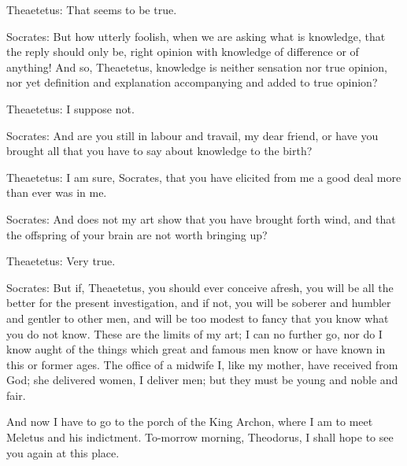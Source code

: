 Theaetetus: That seems to be true.

Socrates: But how utterly foolish, when we are asking what is knowledge,
that the reply should only be, right opinion with knowledge of
difference or of anything! And so, Theaetetus, knowledge is neither
sensation nor true opinion, nor yet definition and explanation
accompanying and added to true opinion?

Theaetetus: I suppose not.

Socrates: And are you still in labour and travail, my dear friend, or
have you brought all that you have to say about knowledge to the birth?

Theaetetus: I am sure, Socrates, that you have elicited from me a good
deal more than ever was in me.

Socrates: And does not my art show that you have brought forth wind, and
that the offspring of your brain are not worth bringing up?

Theaetetus: Very true.

Socrates: But if, Theaetetus, you should ever conceive afresh, you will
be all the better for the present investigation, and if not, you will be
soberer and humbler and gentler to other men, and will be too modest
to fancy that you know what you do not know. These are the limits of my
art; I can no further go, nor do I know aught of the things which great
and famous men know or have known in this or former ages. The office
of a midwife I, like my mother, have received from God; she delivered
women, I deliver men; but they must be young and noble and fair.

And now I have to go to the porch of the King Archon, where I am to meet
Meletus and his indictment. To-morrow morning, Theodorus, I shall hope
to see you again at this place.





